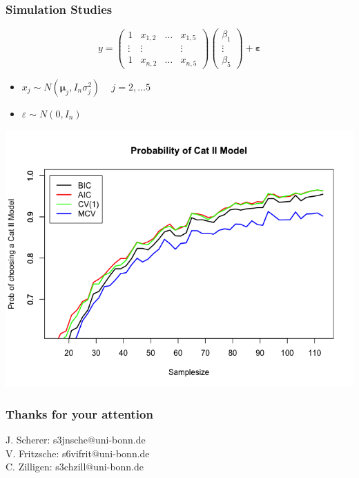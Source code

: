 \documentclass[20pt,mathserif]{beamer}
\begin{document}
\begin{frame}
\frametitle{Simulation Studies}
\begin{equation*}
y =\begin{pmatrix}
1 & x_{1,2} & \ldots & x_{1,5}\\
\vdots & \vdots& & \vdots\\
1& x_{n,2} &\ldots & x_{n,5}
\end{pmatrix}
\begin{pmatrix}
\beta_1\\
\vdots\\
\beta_5
\end{pmatrix}
+\mathbf{{\varepsilon}}
\end{equation*}
\begin{itemize}
	\item $x_{j} \sim N(\mathbf{{\mu}}_j,{I}_n\sigma^2_j)$ ~  $ j=2,\ldots5$
	\item $\varepsilon \sim N(0,{I}_n)$
\end{itemize}
\end{frame}

\begin{frame}
\centering
\includegraphics[width=1.3\textheight]{Simulation1.png}
\end{frame}

\begin{frame}
\frametitle{Thanks for your attention }
J. Scherer: s3jnsche$@$uni-bonn.de\\
V. Fritzsche: s6vifrit$@$uni-bonn.de\\
C. Zilligen: s3chzill$@$uni-bonn.de

\end{frame}
\end{document}
